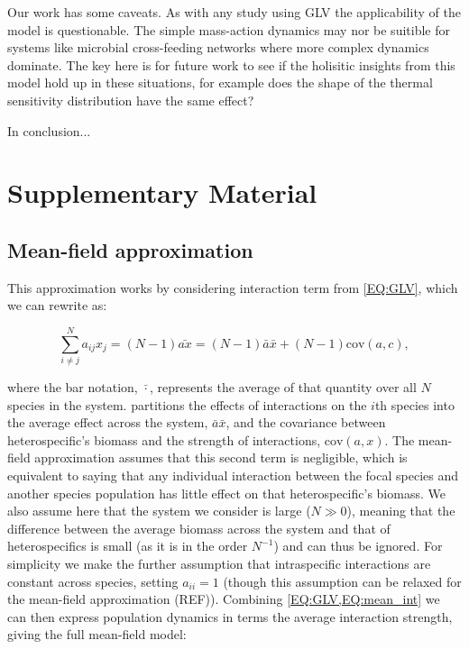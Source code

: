 \documentclass{article}
\begin{document}
Our work has some caveats. As with any study using GLV the applicability of the model is questionable. The simple mass-action dynamics may nor be suitible for systems like microbial cross-feeding networks where more complex dynamics dominate. The key here is for future work to see if the holisitic insights from this model hold up in these situations, for example does the shape of the thermal sensitivity distribution  have the same effect?

In conclusion...

\newpage
\section{Supplementary Material}

\subsection{Mean-field approximation} \label{SI_Sec:Meanfield}

This approximation works by considering interaction term from \cref{EQ:GLV}, which we can rewrite as:

\begin{equation} \label{EQ:mean_int} 
    \sum^N_{i \neq j} a_{ij} x_j = (N-1) \bar{a x} = (N-1) \bar{a} \bar{x} + (N-1) \text{cov}(a,c),
\end{equation}

where the bar notation, $\bar{\cdot}$, represents the average of that quantity over all $N$ species in the system.  partitions the effects of interactions on the $i$th species into the average effect across the system, $\bar{a} \bar{x}$, and the covariance between heterospecific's biomass and the strength of interactions, $\text{cov}(a,x)$. The mean-field approximation assumes that this second term is negligible, which is equivalent to saying that any individual interaction between the focal species and another species population has little effect on that heterospecific's biomass. We also assume here that the system we consider is large ($N \gg 0$), meaning that the difference between the average biomass across the system and that of heterospecifics is small (as it is in the order $N^{-1}$) and can thus be ignored. For simplicity we make the further assumption that intraspecific interactions are constant across species, setting $a_{ii} = 1$ (though this assumption can be relaxed for the mean-field approximation (REF)). Combining \cref{EQ:GLV,EQ:mean_int} we can then express population dynamics in terms the average interaction strength, giving the full mean-field model:
\end{document}
